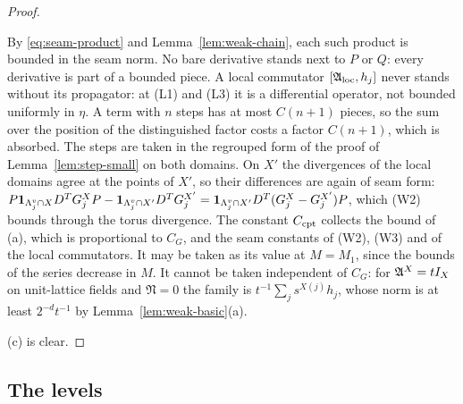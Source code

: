 \begin{proof}
\begin{itemize}
\end{itemize}
By \eqref{eq:seam-product} and Lemma~\ref{lem:weak-chain}, each such product is bounded in the seam norm. No bare derivative stands next to $P$ or $Q$: every derivative is part of a bounded piece. A local commutator $[\mathfrak A_{\rm loc},h_j]$ never stands without its propagator: at (L1) and (L3) it is a differential operator, not bounded uniformly in $\eta$. A term with $n$ steps has at most $C(n+1)$ pieces, so the sum over the position of the distinguished factor costs a factor $C(n+1)$, which is absorbed. The steps are taken in the regrouped form of the proof of Lemma~\ref{lem:step-small} on both domains. On $X'$ the divergences of the local domains agree at the points of $X'$, so their differences are again of seam form: $P\mathbf 1_{\Lambda^v_j\cap X}D^TG^X_jP-\mathbf 1_{\Lambda^v_j\cap X'}D^TG^{X'}_j=\mathbf 1_{\Lambda^v_j\cap X'}D^T(G^X_j-G^{X'}_j)P$, which (W2) bounds through the torus divergence. The constant $C_{\rm cpt}$ collects the bound of (a), which is proportional to $C_G$, and the seam constants of (W2), (W3) and of the local commutators. It may be taken as its value at $M=M_1$, since the bounds of the series decrease in $M$. It cannot be taken independent of $C_G$: for $\mathfrak A^X=tI_X$ on unit-lattice fields and $\mathfrak N=0$ the family is $t^{-1}\sum_js^{X(j)}h_j$, whose norm is at least $2^{-d}t^{-1}$ by Lemma~\ref{lem:weak-basic}(a).

(c) is clear.
\end{proof}

\subsection{The levels}\label{ss:41.3}

